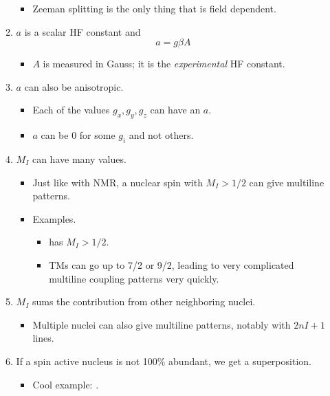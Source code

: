 \documentclass[../notes.tex]{subfiles}
\begin{document}
\begin{itemize}
\begin{enumerate}
        \begin{itemize}
            \item Zeeman splitting is the only thing that is field dependent.
        \end{itemize}
        \item $a$ is a scalar HF constant and
        \begin{equation*}
            a = g\beta A
        \end{equation*}
        \begin{itemize}
            \item $A$ is measured in Gauss; it is the \emph{experimental} HF constant.
        \end{itemize}
        \item $a$ can also be anisotropic.
        \begin{itemize}
            \item Each of the values $g_x,g_y,g_z$ can have an $a$.
            \item $a$ can be 0 for some $g_i$ and not others.
        \end{itemize}
        \item $M_I$ can have many values.
        \begin{itemize}
            \item Just like with NMR, a nuclear spin with $M_I>1/2$ can give multiline patterns.
            \item Examples.
            \begin{itemize}
                \item {} has $M_I>1/2$.
                \item TMs can go up to 7/2 or 9/2, leading to very complicated multiline coupling patterns very quickly.
            \end{itemize}
        \end{itemize}
        \item $M_I$ sums the contribution from other neighboring nuclei.
        \begin{itemize}
            \item Multiple nuclei can also give multiline patterns, notably with $2nI+1$ lines.
        \end{itemize}
        \item If a spin active nucleus is not 100\% abundant, we get a superposition.
        \begin{itemize}
            \item Cool example: .

\end{itemize}
\end{enumerate}
\end{itemize}
\end{document}
